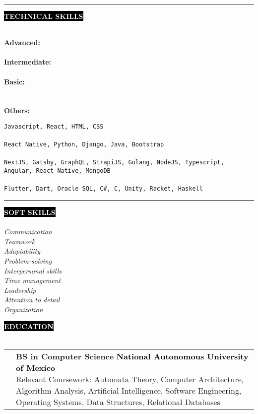 \documentclass[11pt,A4]{article}
\makeatletter
\newcounter{a}
\newcounter{b}
\newcounter{c}
\newcommand{\cvsection}[1] {
  \textcolor{white}{\MakeUppercase{\textbf{#1}}}
}
\newcommand{\cvsect}[1]{
  \colorbox{black}{{\cvsection{#1}}}\\ \\%
}
\newenvironment{entrylist}{%
  \begin{tabular*}{\textwidth}[t]{@{\extracolsep{\fill}}ll}
  }{%
  \end{tabular*}
}
\newcommand{\entry}[5]{%
  &\parbox[t]{17.5cm}{%
    \large\textbf{#1}%
    \hfill
    {\small \textbf{\textcolor{black}{#2}}}\\%
    \normalsize #4\\
    \texttt{#5}
  }\\\\}
\makeatother
\begin{document}
  \begin{minipage}[t]{.8\textwidth}\hrule height 0pt width 0pt%
  \cvsect{Technical Skills}
  \begin{minipage}[t]{0.22\textwidth}
    \textbf{Advanced: }\\ \\
    \textbf{Intermediate: }\\ \\
    \textbf{Basic: } \\ \\ \\
    \textbf{Others: }
  \end{minipage}
  \begin{minipage}[t]{.8\textwidth}%
    \texttt{Javascript, React, HTML, CSS} \\ \\
    \texttt{React Native, Python, Django, Java, Bootstrap} \\ \\
    \texttt{NextJS, Gatsby, GraphQL, StrapiJS, Golang, NodeJS, Typescript, Angular, React Native, MongoDB} \\ \\
    \texttt{Flutter, Dart, Oracle SQL, C\#, C, Unity, Racket, Haskell}
  \end{minipage}%
  \end{minipage}
  \hspace{.2cm}
    \begin{minipage}[t]{0.3\textwidth}\hrule height 0pt width 0pt%
    \cvsect{Soft skills}
    \textit{Communication}\\
    \textit{Teamwork}\\
    \textit{Adaptability}\\
    \textit{Problem-solving}\\
    \textit{Interpersonal skills}\\
    \textit{Time management}\\
    \textit{Leadership}\\
    \textit{Attention to detail}\\
    \textit{Organization}
  \end{minipage} \vspace{0.2cm}
  
    \cvsect{Education}
  \begin{entrylist}
    \entry
    {BS in Computer Science}
    {National Autonomous University of Mexico }
    {UNAM, Faculty of Science}
    {Relevant Coursework: Automata Theory, Computer Architecture, Algorithm Analysis, Artificial Intelligence, Software Engineering, Operating Systems, Data Structures, Relational Databases} 
    {}
  \end{entrylist}
\end{document}
